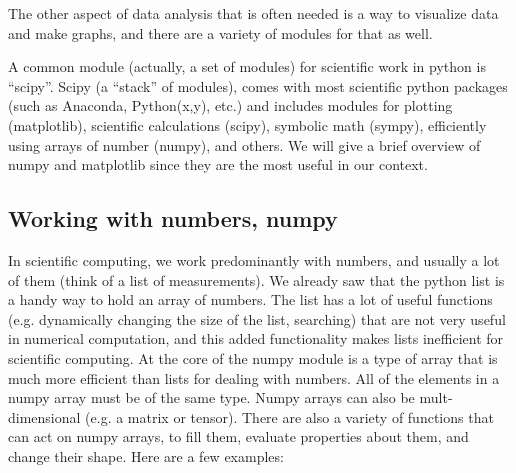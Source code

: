 The other aspect of data analysis that is often needed is a way to visualize data and make graphs, and there are a variety of modules for that as well. 

A common module (actually, a set of modules) for scientific work in python is ``scipy''. Scipy (a ``stack'' of modules), comes with most scientific python packages (such as Anaconda, Python(x,y), etc.) and includes modules for plotting (matplotlib), scientific calculations (scipy), symbolic math (sympy), efficiently using arrays of number (numpy), and others. We will give a brief overview of numpy and matplotlib since they are the most useful in our context.

\subsection{Working with numbers, numpy}
In scientific computing, we work predominantly with numbers, and usually a lot of them (think of a list of measurements). We already saw that the python list is a handy way to hold an array of numbers. The list has a lot of useful functions (e.g. dynamically changing the size of the list, searching) that are not very useful in numerical computation, and this added functionality makes lists inefficient for scientific computing. At the core of the numpy module is a type of array that is much more efficient than lists for dealing with numbers. All of the elements in a numpy array must be of the same type. Numpy arrays can also be mult-dimensional (e.g. a matrix or tensor). There are also a variety of functions that can act on numpy arrays, to fill them, evaluate properties about them, and change their shape. Here are a few examples:

